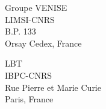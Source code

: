 \begin{titlepage}
\begin{center}
\begin{tabular}{l l l}
	\end{tabular}
\end{center}






\setlength{\columnsep}{7mm}
\setlength{\columnseprule}{0pt}

\begin{multicols}{2} 
\small 
\noindent Groupe VENISE	\\	
\noindent LIMSI-CNRS					\\
\noindent B.P. 133				\\
 Orsay Cedex, France \\	

\columnbreak

\raggedleft LBT \\
\noindent IBPC-CNRS \\
 Rue Pierre et Marie Curie  \\
 Paris, France
\end{multicols}



\end{titlepage}